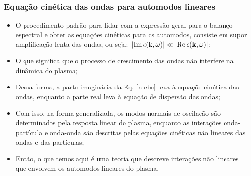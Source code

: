 \documentclass[10pt,aspectratio=1610,lualatex]{beamer}
\begin{document}
\begin{frame}
  \frametitle{Equação cinética das ondas para automodos lineares}
  \begin{itemize}
    \item O procedimento padrão para lidar com a expressão geral para
    o balanço espectral e obter as equações cinéticas para os automodos,
    consiste em supor amplificação lenta das ondas, ou seja:\,
    $|\mbox{Im}\, \epsilon({\bf k},\omega)|\ll|\mbox{Re}\, \epsilon({\bf k},\omega)|$;
    \vspace{0.2cm}
    \item O que significa que o processo de crescimento das ondas não
    interfere na dinâmica do plasma;
    \vspace{0.2cm}
    \item Dessa forma, a parte imaginária da Eq. \eqref{nlebe} leva à equação
    cinética das ondas, enquanto a parte real leva à equação de dispersão
    das ondas;
    \vspace{0.2cm}
    \item  Com isso, na forma generalizada, os modos normais de oscilação
    são determinados pela resposta linear do plasma, enquanto as interações
    onda-partícula e onda-onda são descritas pelas equações cinéticas não
    lineares das ondas e das partículas;
    \vspace{0.2cm}
    \item Então, o que temos aqui é uma teoria que descreve interações
    não lineares que envolvem os automodos lineares do plasma. 
  \end{itemize}
\end{frame}
\end{document}
